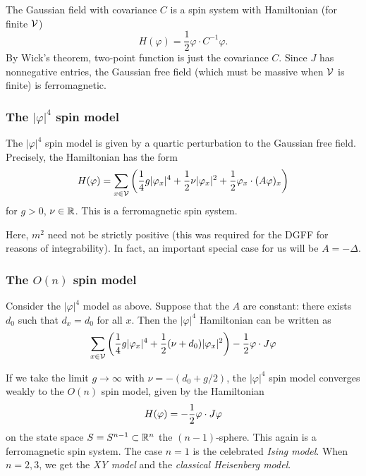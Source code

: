 The Gaussian field with covariance $C$ is a spin system with Hamiltonian (for finite
$\mathcal{V}$)
\begin{equation}
H(\varphi) = \frac{1}{2} \varphi \cdot C^{-1} \varphi.
\end{equation}
By Wick's theorem, two-point function is just the covariance $C$.
Since $J$ has nonnegative entries, the Gaussian free field (which must be massive when
$\mathcal{V}$ is finite) is ferromagnetic.


\subsubsection{The $|\varphi|^4$ spin model}

The $|\varphi|^4$ spin model is given by a quartic perturbation to the Gaussian free field.
Precisely, the Hamiltonian has the form
\begin{equation}
H(\varphi)
  =
\sum_{x\in\mathcal{V}}
\left(
  \frac{1}{4} g |\varphi_x|^4
    +
  \frac{1}{2} \nu |\varphi_x|^2
    +
  \frac{1}{2} \varphi_x \cdot (A \varphi)_x
\right)
\end{equation}
for $g > 0$, $\nu\in{\mathbb R}$. This is a ferromagnetic spin system.

Here, $m^2$ need not be strictly positive (this was required for the DGFF for reasons of
integrability). In fact, an important special case for us will be $A = -\Delta$.


\subsubsection{The $O(n)$ spin model}

Consider the $|\varphi|^4$ model as above. Suppose that the $A$ are constant:
there exists $d_0$ such that $d_x = d_0$ for all $x$.
Then the $|\varphi|^4$ Hamiltonian can be written as
\begin{equation}
\sum_{x\in\mathcal{V}}
\left(
  \frac{1}{4} g |\varphi_x|^4
    +
  \frac{1}{2} (\nu + d_0) |\varphi_x|^2
\right)
  -
\frac{1}{2} \varphi \cdot J \varphi
\end{equation}

If we take the limit $g\to\infty$ with $\nu = -(d_0 + g / 2)$, the
$|\varphi|^4$ spin model converges
weakly to the $O(n)$ spin model, given by the Hamiltonian
\begin{equation}
H(\varphi) = -\frac{1}{2} \varphi \cdot J \varphi
\end{equation}
on the state space $S = S^{n-1} \subset {\mathbb R}^n$ the $(n-1)$-sphere.
This again is a ferromagnetic spin system.
The case $n = 1$ is the celebrated \emph{Ising model}. When $n = 2, 3$,
we get the \emph{XY model} and the \emph{classical Heisenberg model}.

